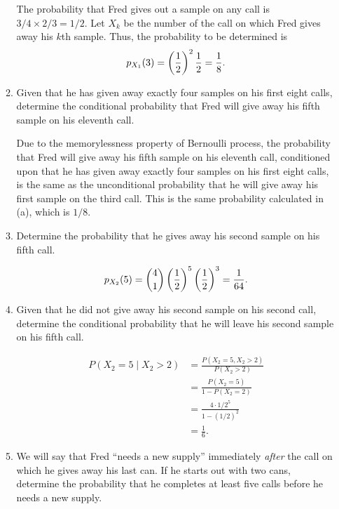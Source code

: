 \begin{enumerate}
\begin{enumerate}
    The probability that Fred gives out a sample on any call is
    \(3/4 \times 2/3 = 1/2\).  Let \(X_k\) be the number of the call
    on which Fred gives away his \(k\)th sample.  Thus, the
    probability to be determined is
    \[p_{X_1}(3) = \left( \frac12 \right)^2 \frac12 = \frac18.\]

  \item {} Given that he has given away exactly
    four samples on his first eight calls, determine the conditional
    probability that Fred will give away his fifth sample on his
    eleventh call.

    Due to the memorylessness property of Bernoulli process, the
    probability that Fred will give away his fifth sample on his
    eleventh call, conditioned upon that he has given away exactly
    four samples on his first eight calls, is the same as the
    unconditional probability that he will give away his first sample
    on the third call.  This is the same probability calculated in
    (a), which is \(1/8\).

  \item {} Determine the probability that he
    gives away his second sample on his fifth call.

    \[p_{X_2}(5) = \binom{4}{1} \left( \frac12 \right)^5 \left( \frac12 \right)^3 = \frac{1}{64}.\]

  \item {} Given that he did not give away
    his second sample on his second call, determine the conditional
    probability that he will leave his second sample on his fifth
    call.

    \begin{align*}
      P(X_2 = 5 \mid X_2 > 2) &= \frac{P(X_2 = 5, X_2 > 2)}{P(X_2 > 2)} \\
                              &= \frac{P(X_2 = 5)}{1 - P(X_2 = 2)} \\
                              &= \frac{4 \cdot 1/2^5}{1 - (1/2)^2} \\
                              &= \frac{1}{6}.
    \end{align*}

  \item {} We will say that Fred “needs a new
    supply” immediately \emph{after} the call on which he gives away
    his last can.  If he starts out with two cans, determine the
    probability that he completes at least five calls before he needs
    a new supply.


\end{enumerate}
\end{enumerate}
